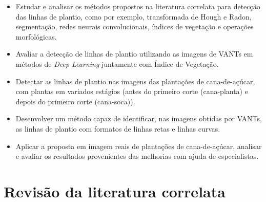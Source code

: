 \documentclass[12pt, a4paper, english, brazil]{article}
\begin{document}
\begin{itemize}
    \item Estudar e analisar os métodos propostos na literatura correlata para detecção das linhas de plantio, como por exemplo, transformada de Hough e Radon, segmentação, redes neurais convolucionais, índices de vegetação e operações morfológicas.

    \item Avaliar a detecção de linhas de plantio utilizando as imagens de VANTs em métodos de \textit{Deep Learning} juntamente com Índice de Vegetação.

    \item Detectar as linhas de plantio nas imagens das plantações de cana-de-açúcar, com plantas em variados estágios (antes do primeiro corte (cana-planta) e depois do primeiro corte (cana-soca)).

    \item Desenvolver um método capaz de identificar, nas imagens obtidas por VANTs, as linhas de plantio com formatos de linhas retas e linhas curvas.

    \item Aplicar a proposta em imagem reais de plantações de cana-de-açúcar, analisar e avaliar os resultados provenientes das melhorias com ajuda de especialistas.
\end{itemize}



\section{Revisão da literatura correlata}
\end{document}
